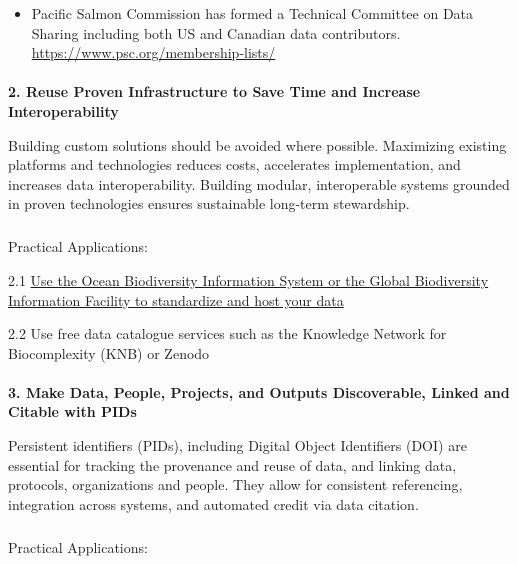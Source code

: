 \documentclass[
  letterpaper,
  DIV=11,
  numbers=noendperiod]{scrartcl}
\makeatletter
\let\oldparagraph\paragraph
\renewcommand{\paragraph}{
    \@ifstar
      \xxxParagraphStar
      \xxxParagraphNoStar
  }
\newcommand{\xxxParagraphStar}[1]{\oldparagraph*{#1}\mbox{}}
\newcommand{\xxxParagraphNoStar}[1]{\oldparagraph{#1}\mbox{}}
\let\oldsubparagraph\subparagraph
\renewcommand{\subparagraph}{
    \@ifstar
      \xxxSubParagraphStar
      \xxxSubParagraphNoStar
  }
\newcommand{\xxxSubParagraphStar}[1]{\oldsubparagraph*{#1}\mbox{}}
\newcommand{\xxxSubParagraphNoStar}[1]{\oldsubparagraph{#1}\mbox{}}
\providecommand{\tightlist}{%
  \setlength{\itemsep}{0pt}\setlength{\parskip}{0pt}}\usepackage{longtable,booktabs,array}
\makeatother
\begin{document}
\begin{itemize}
\tightlist
\item
  Pacific Salmon Commission has formed a Technical Committee on Data
  Sharing including both US and Canadian data contributors.
  \url{https://www.psc.org/membership-lists/}
\end{itemize}

\paragraph{\texorpdfstring{\textbf{2. Reuse Proven Infrastructure to
Save Time and Increase
Interoperability}}{2. Reuse Proven Infrastructure to Save Time and Increase Interoperability}}\label{reuse-proven-infrastructure-to-save-time-and-increase-interoperability}

Building custom solutions should be avoided where possible. Maximizing
existing platforms and technologies reduces costs, accelerates
implementation, and increases data interoperability. Building modular,
interoperable systems grounded in proven technologies ensures
sustainable long-term stewardship.

\subparagraph{Practical Applications:}\label{practical-applications-1}

2.1 \href{https://doi.org/10.14286/duc6mu}{Use the Ocean Biodiversity
Information System or the Global Biodiversity Information Facility to
standardize and host your data}

2.2 Use free data catalogue services such as the Knowledge Network for
Biocomplexity (KNB) or Zenodo

\paragraph{\texorpdfstring{\textbf{3. Make Data, People, Projects, and
Outputs Discoverable, Linked and Citable with
PIDs}}{3. Make Data, People, Projects, and Outputs Discoverable, Linked and Citable with PIDs}}\label{make-data-people-projects-and-outputs-discoverable-linked-and-citable-with-pids}

Persistent identifiers (PIDs), including Digital Object Identifiers
(DOI) are essential for tracking the provenance and reuse of data, and
linking data, protocols, organizations and people. They allow for
consistent referencing, integration across systems, and automated credit
via data citation.

\subparagraph{Practical Applications:}\label{practical-applications-2}
\end{document}
